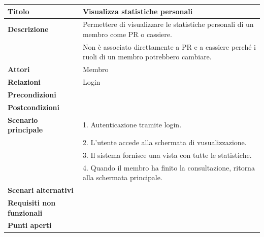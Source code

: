 \documentclass[a4paper]{article}
\begin{document}


  \begin{center}
    \begin{tabularx}{1\textwidth}{l|X}
        \textbf{Titolo} & Visualizza statistiche personali \\
        \hline
        \textbf{Descrizione} & Permettere di visualizzare le statistiche personali di un membro come PR o cassiere. \\
                             & Non è associato direttamente a PR e a cassiere perché i ruoli di un membro potrebbero cambiare.\\
        \hline
        \textbf{Attori} & Membro \\
        \hline
        \textbf{Relazioni} & Login \\
        \hline
        \textbf{Precondizioni} &  \\
        \hline
        \textbf{Postcondizioni} &  \\
        \hline
        \textbf{Scenario principale} & 1. Autenticazione tramite login. \\
                                     & 2. L'utente accede alla schermata di vusualizzazione. \\
                                     & 3. Il sistema fornisce una vista con tutte le statistiche. \\
                                     & 4. Quando il membro ha finito la consultazione, ritorna alla schermata principale.\\
        \hline
        \textbf{Scenari alternativi} & \\
        \hline
        \textbf{Requisiti non funzionali} & \\
        \hline
        \textbf{Punti aperti} & \\
        \hline
    \end{tabularx}
  \end{center}


\end{document}
